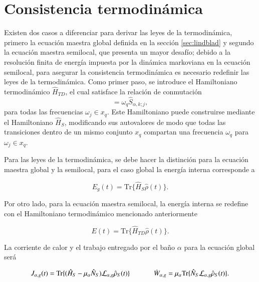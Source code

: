 \section{Consistencia termodinámica}
Existen dos casos a diferenciar para derivar las leyes de la termodinámica, primero la ecuación maestra global definida en la sección \ref{sec:lindblad} y segundo la ecuación maestra semilocal, que presenta un mayor desafío; debido a la resolución finita de energía impuesta por la dinámica markoviana en la ecuación semilocal, para asegurar la consistencia termodinámica es necesario redefinir las leyes de la termodinámica. Como primer paso, se introduce el Hamiltoniano termodinámico $\hat{H}_{TD}$, el cual satisface la relación de conmutación
\label{sec2:thermolaws}
\begin{equation*}
    [\hat{S}_{\alpha,k;j},\hat{H}_{TD}] = \omega_{q}\hat{S}_{\alpha,k;j},
\end{equation*}
para todas las frecuencias $\omega_{j} \in x_{q}$. Este Hamiltoniano puede construirse mediante el Hamiltoniano $\hat{H}_{S}$, modificando sus autovalores de modo que todas las transiciones dentro de un mismo conjunto $x_q$ compartan una frecuencia $\omega_{q}$ para $\omega_{j} \in x_{q}$.

Para las leyes de la termodinámica, se debe hacer la distinción para la ecuación maestra global y la semilocal, para el caso global la energía interna corresponde a 

\begin{equation*}
    E_{g}(t) = \text{Tr}\{\hat{H}_{S}\hat{\rho}(t) \}.
\end{equation*}

Por otro lado, para la ecuación maestra semilocal, la energía interna se redefine con el Hamiltoniano termodinámico mencionado anteriormente 

\begin{equation}
    E(t) = \text{Tr}\{\hat{H}_{TD}\hat{\rho}(t) \}.
\label{sec2:energyeq}
\end{equation}

La corriente de calor y el trabajo entregado por el baño $\alpha$ para la ecuación global será

\begin{equation*}
    J_{\alpha,g}(t) = \text{Tr}\{(\hat{H}_{S} - \mu_{\alpha}\hat{N}_S)\mathcal{L}_{\alpha,g}\hat{\rho}_{S}(t) \} \hspace{12mm} \dot{W}_{\alpha,g} = \mu_{\alpha} \text{Tr}\{\hat{N}_{S}\mathcal{L}_{\alpha,g}\hat{\rho}_{S}(t) \}.
\end{equation*}

